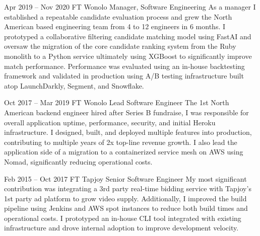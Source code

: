 \documentclass[
	10pt, %
]{FreemanCV}
\begin{document}
\begin{paracol}{2}

\jobentry
	{Apr 2019 -- Nov 2020} %
	{FT} %
	{Wonolo} %
	{Manager, Software Engineering} %
	{As a manager I established a repeatable candidate evaluation process and grew the North American based engineering team from 4 to 12 engineers in 6 months. I prototyped a collaborative filtering candidate matching model using FastAI and oversaw the migration of the core candidate ranking system from the Ruby monolith to a Python service ultimately using XGBoost to significantly improve match performance. Performance was evaluated using an in-house backtesting framework and validated in production using A/B testing infrastructure built atop LaunchDarkly, Segment, and Snowflake.} %


\jobentry
	{Oct 2017 -- Mar 2019} %
	{FT} %
	{Wonolo} %
	{Lead Software Engineer} %
	{The 1st North American backend engineer hired after Series B fundraise, I was responsible for overall application uptime, performance, security, and initial Heroku infrastructure. I designed, built, and deployed multiple features into production, contributing to multiple years of 2x top-line revenue growth. I also lead the application side of a migration to a containerized service mesh on AWS using Nomad, significantly reducing operational costs. } %


\jobentry
	{Feb 2015 -- Oct 2017} %
	{FT} %
	{Tapjoy} %
	{Senior Software Engineer} %
	{My most significant contribution was integrating a 3rd party real-time bidding service with Tapjoy's 1st party ad platform to grow video supply. Additionally, I improved the build pipeline using Jenkins and AWS spot instances to reduce both build times and operational costs. I prototyped an in-house CLI tool integrated with existing infrastructure and drove internal adoption to improve development velocity.} %



\switchcolumn %



\end{paracol}
\end{document}
